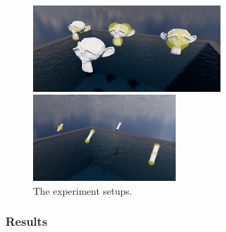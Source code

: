 \begin{figure}[H]
	\centering
	\begin{subcaptionblock}{0.55\textwidth}
		\centering
		\includegraphics[height=1.3in]{./figures/exp3/suzzanes.png}
	\end{subcaptionblock}
	\begin{subcaptionblock}{0.4\textwidth}
		\centering
		\includegraphics[height=1.3in]{./figures/exp3/bats.png}
	\end{subcaptionblock}
	\caption{The experiment setups.}
	\label{fig:exp3-setup}
\end{figure}

\subsubsection*{Results}

